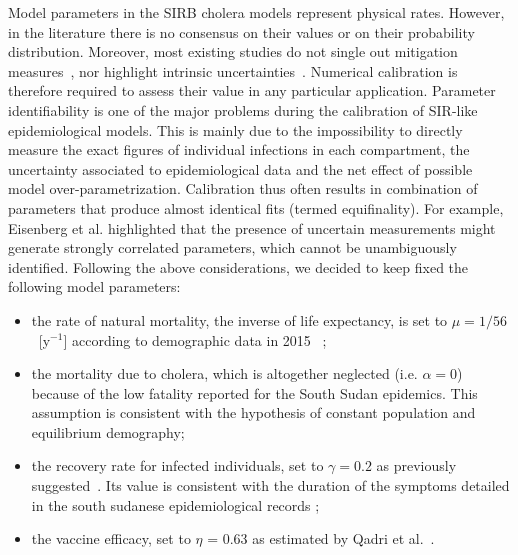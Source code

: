 Model parameters in the SIRB cholera models represent physical rates. However, in the literature there is no consensus on their values or on their  probability distribution. Moreover, most existing studies do not single out mitigation measures~\cite{mari15,pasetto17}, nor highlight intrinsic uncertainties~\cite{rinaldo12,pasetto17}. Numerical calibration is therefore required to assess their value in any particular application. Parameter identifiability is one of the major problems during the calibration of SIR-like epidemiological models. This is mainly due to the impossibility to directly measure the exact figures of individual infections in each compartment, the uncertainty associated to epidemiological data and the net effect of possible model over-parametrization. Calibration thus often results in combination of parameters that produce almost identical fits (termed equifinality). For example, Eisenberg et al. \cite{eisenberg_identifiability_2013} highlighted that the presence of uncertain measurements might generate strongly correlated parameters, which cannot be unambiguously  identified.
Following the above considerations, we decided to keep fixed the following model parameters: 
\begin{itemize}
  \item the rate of natural mortality, the inverse of life expectancy, is set to $\mu=1/56 $~[y$^{-1}$] according to demographic data in 2015 ~\cite{CIA2015}; 
  \item the mortality due to cholera, which is altogether neglected (i.e. $\alpha=0$) because of the low fatality reported for the South Sudan epidemics. This assumption is consistent with the hypothesis of constant population and equilibrium demography; 
  \item the recovery rate for infected individuals, set to $\gamma=0.2$ as previously suggested~\cite{rinaldo12}. Its value is consistent with the duration of the symptoms detailed in the south sudanese epidemiological records \cite{sciarra16};
  \item the vaccine efficacy, set to $\eta$ = 0.63 as estimated by Qadri et al.~\cite{quadri16}.
\end{itemize} 

